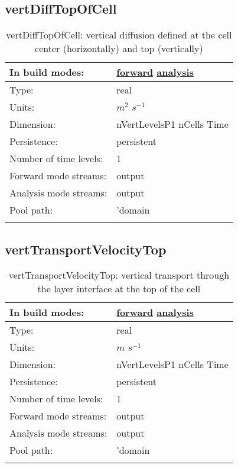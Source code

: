 \subsection[vertDiffTopOfCell]{vertDiffTopOfCell}
\label{subsec:var_sec_diagnostics_vertDiffTopOfCell}
\begin{center}
\begin{longtable}{| p{2.0in} | p{4.0in} |}
        \hline 
        In build modes: & \hyperref[subsec:forward_var_tab_diagnostics]{forward} \hyperref[subsec:analysis_var_tab_diagnostics]{analysis} \\
        \hline 
        Type: & real \\
        \hline 
        Units: & $m^2$ $s^{-1}$ \\
        \hline 
        Dimension: & nVertLevelsP1 nCells Time \\
        \hline 
        Persistence: & persistent \\
        \hline 
        Number of time levels: & 1 \\
        \hline 
		 Forward mode streams: &  output \\
        \hline 
		 Analysis mode streams: &  output \\
        \hline 
            Pool path: & 'domain %
 \\
		 \hline 
    \caption{vertDiffTopOfCell: vertical diffusion defined at the cell center (horizontally) and top (vertically)}
\end{longtable}
\end{center}
\subsection[vertTransportVelocityTop]{vertTransportVelocityTop}
\label{subsec:var_sec_diagnostics_vertTransportVelocityTop}
\begin{center}
\begin{longtable}{| p{2.0in} | p{4.0in} |}
        \hline 
        In build modes: & \hyperref[subsec:forward_var_tab_diagnostics]{forward} \hyperref[subsec:analysis_var_tab_diagnostics]{analysis} \\
        \hline 
        Type: & real \\
        \hline 
        Units: & $m$ $s^{-1}$ \\
        \hline 
        Dimension: & nVertLevelsP1 nCells Time \\
        \hline 
        Persistence: & persistent \\
        \hline 
        Number of time levels: & 1 \\
        \hline 
		 Forward mode streams: &  output \\
        \hline 
		 Analysis mode streams: &  output \\
        \hline 
            Pool path: & 'domain %
 \\
		 \hline 
    \caption{vertTransportVelocityTop: vertical transport through the layer interface at the top of the cell}
\end{longtable}
\end{center}
